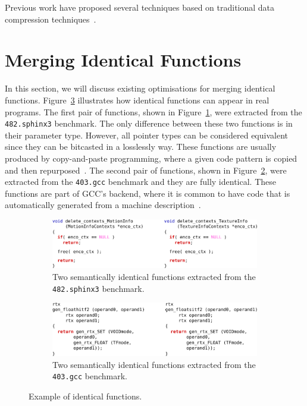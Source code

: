 Previous work have proposed several techniques based on traditional data compression techniques~\cite{ernst97,cooper99compression,lekatsas98,lekatsas00,beszedes03}.

\section{Merging Identical Functions}

In this section, we will discuss existing optimisations for merging identical functions.
Figure~\ref{fig:example-identical} illustrates how identical functions can appear in real programs.
The first pair of functions, shown in Figure~\ref{fig:example-identical-1-sphinx3}, were extracted from the \texttt{482.sphinx3} benchmark.
The only difference between these two functions is in their parameter type.
However, all pointer types can be considered equivalent since they can be bitcasted in a losslessly way.
These functions are usually produced by copy-and-paste programming, where a given code pattern is copied and then repurposed~\cite{kim04,jablonski10,ahmed15}.
The second pair of functions, shown in Figure~\ref{fig:example-identical-2-gcc}, were extracted from the \texttt{403.gcc} benchmark and they are fully identical.
These functions are part of GCC's backend, where it is common to have code that is automatically generated from a machine description~\cite{muchnick98,kolek13,ghica15}.

\begin{figure}[h]
\centering
\begin{subfigure}{\textwidth}
\centering
\includegraphics[scale=0.9]{src/relatedwork/figs/example-identical-1-sphinx3}
\caption{Two semantically identical functions extracted from the \texttt{482.sphinx3} benchmark.}
\label{fig:example-identical-1-sphinx3}
\end{subfigure}
\begin{subfigure}{\textwidth}
\centering
\includegraphics[scale=0.9]{src/relatedwork/figs/example-identical-2-gcc}
\caption{Two semantically identical functions extracted from the \texttt{403.gcc} benchmark.}
\label{fig:example-identical-2-gcc}
\end{subfigure}
\caption{Example of identical functions.}
\label{fig:example-identical}
\end{figure}

